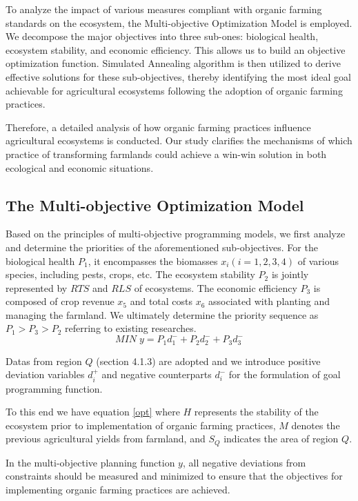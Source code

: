 \documentclass[12pt]{article}
\begin{document}
To analyze the impact of various measures compliant with organic farming standards on the ecosystem, the Multi-objective Optimization Model is employed. We decompose the major objectives into three  sub-ones: biological health, ecosystem stability, and economic efficiency. This allows us to build an objective optimization function. Simulated Annealing algorithm is then utilized to derive effective solutions for these sub-objectives, thereby identifying the most ideal goal achievable for agricultural ecosystems following the adoption of organic farming practices.

Therefore, a detailed analysis of how organic farming practices influence agricultural ecosystems is conducted. Our study clarifies the mechanisms of which practice of transforming farmlands could achieve a win-win solution in both ecological and economic situations.

\subsection{The Multi-objective Optimization Model}
\hspace{2em}Based on the principles of multi-objective programming models, we first analyze and determine the priorities of the aforementioned sub-objectives. For the biological health $P_1$, it encompasses the biomasses $x_i(i = 1,2,3,4)$ of various species, including pests, crops, etc. The ecosystem stability  $P_2$ is jointly represented by $RTS$ and $RLS$ of ecosystems. The economic efficiency $P_3$ is composed of crop revenue $x_5$ and total costs $x_6$ associated with planting and managing the farmland. We ultimately determine the priority sequence as $P_1 > P_3 > P_2$ referring to existing researches.
\begin{equation}
    MIN\;y=P_1d_1^-+P_2d_2^-+P_3d_3^-
\end{equation}

Datas from region $Q$ (section 4.1.3) are adopted and we introduce positive deviation variables $d_i^+$ and negative counterparts $d_i^-$ for the formulation of goal programming function.

To this end we have equation \eqref{opt} where $H$ represents the stability of the ecosystem prior to implementation of organic farming practices, $M$ denotes the previous agricultural yields from farmland, and $S_{Q}$ indicates the area of region $Q$.

In the multi-objective planning function $y$, all negative deviations from constraints should be measured and minimized to ensure that the objectives for implementing organic farming practices are achieved.
\end{document}

